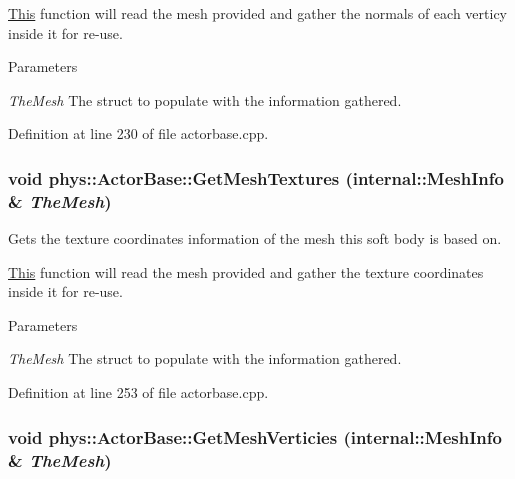 \hyperlink{structThis}{This} function will read the mesh provided and gather the normals of each verticy inside it for re-\/use. 
\begin{DoxyParams}{Parameters}
\item[{\em TheMesh}]The struct to populate with the information gathered. \end{DoxyParams}


Definition at line 230 of file actorbase.cpp.

\hypertarget{classphys_1_1ActorBase_a91c1bd400e1cf0e35682a506aebb7f38}{
\subsubsection[{GetMeshTextures}]{\setlength{\rightskip}{0pt plus 5cm}void phys::ActorBase::GetMeshTextures ({\bf internal::MeshInfo} \& {\em TheMesh})}}
\label{d8/d0f/classphys_1_1ActorBase_a91c1bd400e1cf0e35682a506aebb7f38}


Gets the texture coordinates information of the mesh this soft body is based on. 

\hyperlink{structThis}{This} function will read the mesh provided and gather the texture coordinates inside it for re-\/use. 
\begin{DoxyParams}{Parameters}
\item[{\em TheMesh}]The struct to populate with the information gathered. \end{DoxyParams}


Definition at line 253 of file actorbase.cpp.

\hypertarget{classphys_1_1ActorBase_a795d9d132ed55fa114f15039dcad9055}{
\subsubsection[{GetMeshVerticies}]{\setlength{\rightskip}{0pt plus 5cm}void phys::ActorBase::GetMeshVerticies ({\bf internal::MeshInfo} \& {\em TheMesh})}}
\label{d8/d0f/classphys_1_1ActorBase_a795d9d132ed55fa114f15039dcad9055}


